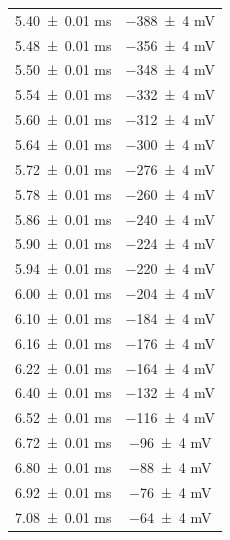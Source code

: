 \documentclass[a4paper]{article}
\begin{document}
\begin{appendices}
\begin{table}[htbp]
\begin{minipage}{0.48\textwidth}
\begin{tabular}{|c|c|}
        \num{5.40 \pm 0.01} \si{\milli\second} & \num{-388 \pm 4} \si{\milli\volt} \\
        \num{5.48 \pm 0.01} \si{\milli\second} & \num{-356 \pm 4} \si{\milli\volt} \\
        \num{5.50 \pm 0.01} \si{\milli\second} & \num{-348 \pm 4} \si{\milli\volt} \\
        \num{5.54 \pm 0.01} \si{\milli\second} & \num{-332 \pm 4} \si{\milli\volt} \\
        \num{5.60 \pm 0.01} \si{\milli\second} & \num{-312 \pm 4} \si{\milli\volt} \\
        \num{5.64 \pm 0.01} \si{\milli\second} & \num{-300 \pm 4} \si{\milli\volt} \\
        \num{5.72 \pm 0.01} \si{\milli\second} & \num{-276 \pm 4} \si{\milli\volt} \\
        \num{5.78 \pm 0.01} \si{\milli\second} & \num{-260 \pm 4} \si{\milli\volt} \\
        \num{5.86 \pm 0.01} \si{\milli\second} & \num{-240 \pm 4} \si{\milli\volt} \\
        \num{5.90 \pm 0.01} \si{\milli\second} & \num{-224 \pm 4} \si{\milli\volt} \\
        \num{5.94 \pm 0.01} \si{\milli\second} & \num{-220 \pm 4} \si{\milli\volt} \\
        \num{6.00 \pm 0.01} \si{\milli\second} & \num{-204 \pm 4} \si{\milli\volt} \\
        \num{6.10 \pm 0.01} \si{\milli\second} & \num{-184 \pm 4} \si{\milli\volt} \\
        \num{6.16 \pm 0.01} \si{\milli\second} & \num{-176 \pm 4} \si{\milli\volt} \\
        \num{6.22 \pm 0.01} \si{\milli\second} & \num{-164 \pm 4} \si{\milli\volt} \\
        \num{6.40 \pm 0.01} \si{\milli\second} & \num{-132 \pm 4} \si{\milli\volt} \\
        \num{6.52 \pm 0.01} \si{\milli\second} & \num{-116 \pm 4} \si{\milli\volt} \\
        \num{6.72 \pm 0.01} \si{\milli\second} & \num{-96 \pm 4} \si{\milli\volt} \\
        \num{6.80 \pm 0.01} \si{\milli\second} & \num{-88 \pm 4} \si{\milli\volt} \\
        \num{6.92 \pm 0.01} \si{\milli\second} & \num{-76 \pm 4} \si{\milli\volt} \\
        \num{7.08 \pm 0.01} \si{\milli\second} & \num{-64 \pm 4} \si{\milli\volt} \\

\end{tabular}
\end{minipage}
\end{table}
\end{appendices}
\end{document}
